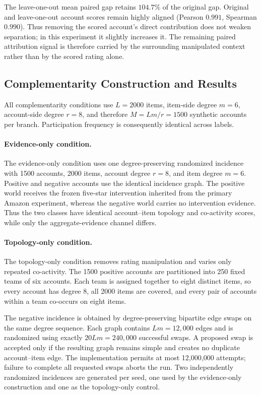 The leave-one-out mean paired gap retains $104.7\%$ of the original gap.
Original and leave-one-out account scores remain highly aligned
(Pearson $0.991$, Spearman $0.990$). Thus removing the scored account's direct
contribution does not weaken separation; in this experiment it slightly
increases it. The remaining paired attribution signal is therefore carried by
the surrounding manipulated context rather than by the scored rating alone.



\subsection{Complementarity Construction and Results}
\label{sec:supp-extra-complementarity}

All complementarity conditions use $L=2000$ items, item-side degree $m=6$,
account-side degree $r=8$, and therefore $M=Lm/r=1500$ synthetic accounts per
branch. Participation frequency is consequently identical across labels.

\paragraph{Evidence-only condition.}
The evidence-only condition uses one degree-preserving randomized incidence
with 1500 accounts, 2000 items, account degree $r=8$, and item degree $m=6$.
Positive and negative accounts use the identical incidence graph. The positive
world receives the frozen five-star intervention inherited from the primary
Amazon experiment, whereas the negative world carries no intervention
evidence. Thus the two classes have identical account--item topology and
co-activity scores, while only the aggregate-evidence channel differs.

\paragraph{Topology-only condition.}
The topology-only condition removes rating manipulation and varies only
repeated co-activity. The 1500 positive accounts are partitioned into 250 fixed
teams of six accounts. Each team is assigned together to eight distinct items,
so every account has degree $8$, all 2000 items are covered, and every pair of
accounts within a team co-occurs on eight items.

The negative incidence is obtained by degree-preserving bipartite edge swaps
on the same degree sequence. Each graph contains $Lm=12{,}000$ edges and is
randomized using exactly $20Lm=240{,}000$ successful swaps. A proposed swap is
accepted only if the resulting graph remains simple and creates no duplicate
account--item edge. The implementation permits at most 12,000,000 attempts;
failure to complete all requested swaps aborts the run. Two independently
randomized incidences are generated per seed, one used by the evidence-only
construction and one as the topology-only control.

